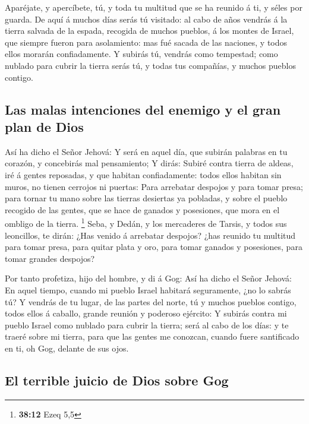  Aparéjate, y apercíbete, tú, y toda tu multitud que se ha
reunido á ti, y séles por guarda.  De aquí á muchos días
serás tú visitado: al cabo de años vendrás á la tierra salvada de la
espada, recogida de muchos pueblos, á los montes de Israel, que siempre
fueron para asolamiento: mas fué sacada de las naciones, y todos ellos
morarán confiadamente.  Y subirás tú, vendrás como
tempestad; como nublado para cubrir la tierra serás tú, y todas tus
compañías, y muchos pueblos contigo.

\hypertarget{las-malas-intenciones-del-enemigo-y-el-gran-plan-de-dios}{%
\subsection{Las malas intenciones del enemigo y el gran plan de
Dios}\label{las-malas-intenciones-del-enemigo-y-el-gran-plan-de-dios}}

 Así ha dicho el Señor Jehová: Y será en aquel día, que
subirán palabras en tu corazón, y concebirás mal pensamiento;
 Y dirás: Subiré contra tierra de aldeas, iré á gentes
reposadas, y que habitan confiadamente: todos ellos habitan sin muros,
no tienen cerrojos ni puertas:  Para arrebatar despojos y
para tomar presa; para tornar tu mano sobre las tierras desiertas ya
pobladas, y sobre el pueblo recogido de las gentes, que se hace de
ganados y posesiones, que mora en el ombligo de la tierra. \footnote{\textbf{38:12}
  Ezeq 5,5}  Seba, y Dedán, y los mercaderes de Tarsis, y
todos sus leoncillos, te dirán: ¿Has venido á arrebatar despojos? ¿has
reunido tu multitud para tomar presa, para quitar plata y oro, para
tomar ganados y posesiones, para tomar grandes despojos?

 Por tanto profetiza, hijo del hombre, y di á Gog: Así ha
dicho el Señor Jehová: En aquel tiempo, cuando mi pueblo Israel habitará
seguramente, ¿no lo sabrás tú?  Y vendrás de tu lugar, de
las partes del norte, tú y muchos pueblos contigo, todos ellos á
caballo, grande reunión y poderoso ejército:  Y subirás
contra mi pueblo Israel como nublado para cubrir la tierra; será al cabo
de los días: y te traeré sobre mi tierra, para que las gentes me
conozcan, cuando fuere santificado en ti, oh Gog, delante de sus ojos.

\hypertarget{el-terrible-juicio-de-dios-sobre-gog}{%
\subsection{El terrible juicio de Dios sobre
Gog}\label{el-terrible-juicio-de-dios-sobre-gog}}

